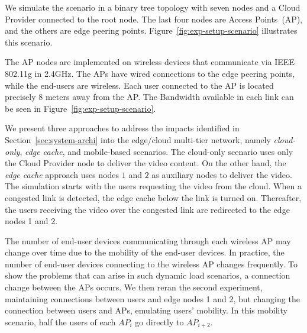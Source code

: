 

We simulate the scenario in a binary tree topology with seven nodes and a Cloud Provider connected to the root node. The last four nodes are Access Points~(AP), and the others are edge peering points. Figure~\ref{fig:exp-setup-scenario} illustrates this scenario.

The AP nodes are implemented on wireless devices that communicate via IEEE 802.11g in 2.4GHz. The APs have wired connections to the edge peering points, while the end-users are wireless. Each user connected to the AP is located precisely 8 meters away from the AP. The Bandwidth available in each link can be seen in Figure~\ref{fig:exp-setup-scenario}.

We present three approaches to address the impacts identified in Section~\ref{sec:system-archi} into the edge/cloud multi-tier network, namely \textit{cloud-only}, \textit{edge cache}, and mobile-based scenarios. The cloud-only scenario uses only the Cloud Provider node to deliver the video content. On the other hand, the \textit{edge cache} approach uses nodes $1$ and $2$ as auxiliary nodes to deliver the video. The simulation starts with the users requesting the video from the cloud. When a congested link is detected, the edge cache below the link is turned on. Thereafter, the users receiving the video over the congested link are redirected to the edge nodes 1 and 2. 

The number of end-user devices communicating through each wireless AP may change over time due to the mobility of the end-user devices. In practice, the number of end-user devices connecting to the wireless AP changes frequently. 
To show the problems that can arise in such dynamic load scenarios, a connection change between the APs occurs. We then reran the second experiment, maintaining connections between users and edge nodes 1 and 2, but changing the connection between users and APs, emulating users' mobility. In this mobility scenario, half the users of each $AP_{i}$ go directly to $AP_{i + 2}$.


